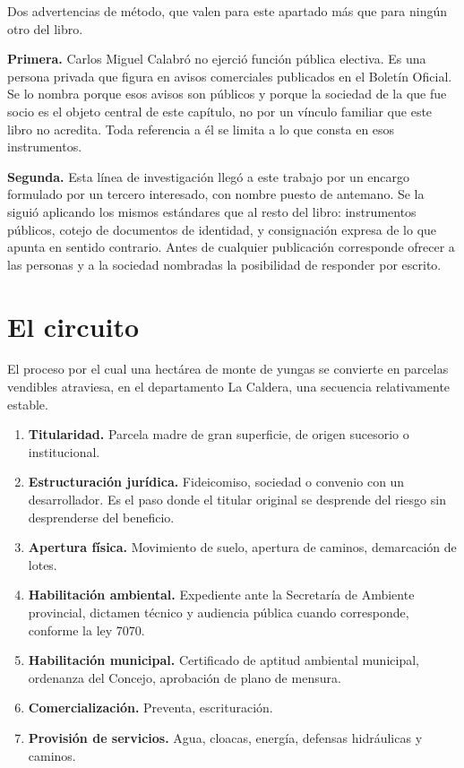 \begin{cautela}
Dos advertencias de método, que valen para este apartado más que para ningún otro del libro.

\textbf{Primera.} Carlos Miguel Calabró no ejerció función pública electiva. Es una persona privada que figura en avisos comerciales publicados en el Boletín Oficial. Se lo nombra porque esos avisos son públicos y porque la sociedad de la que fue socio es el objeto central de este capítulo, no por un vínculo familiar que este libro no acredita. Toda referencia a él se limita a lo que consta en esos instrumentos.

\textbf{Segunda.} Esta línea de investigación llegó a este trabajo por un encargo formulado por un tercero interesado, con nombre puesto de antemano. Se la siguió aplicando los mismos estándares que al resto del libro: instrumentos públicos, cotejo de documentos de identidad, y consignación expresa de lo que apunta en sentido contrario. Antes de cualquier publicación corresponde ofrecer a las personas y a la sociedad nombradas la posibilidad de responder por escrito.
\end{cautela}

\section{El circuito}

El proceso por el cual una hectárea de monte de yungas se convierte en parcelas vendibles atraviesa, en el departamento La Caldera, una secuencia relativamente estable.

\begin{enumerate}
\item \textbf{Titularidad.} Parcela madre de gran superficie, de origen sucesorio o institucional.
\item \textbf{Estructuración jurídica.} Fideicomiso, sociedad o convenio con un desarrollador. Es el paso donde el titular original se desprende del riesgo sin desprenderse del beneficio.
\item \textbf{Apertura física.} Movimiento de suelo, apertura de caminos, demarcación de lotes.
\item \textbf{Habilitación ambiental.} Expediente ante la Secretaría de Ambiente provincial, dictamen técnico y audiencia pública cuando corresponde, conforme la ley 7070.
\item \textbf{Habilitación municipal.} Certificado de aptitud ambiental municipal, ordenanza del Concejo, aprobación de plano de mensura.
\item \textbf{Comercialización.} Preventa, escrituración.
\item \textbf{Provisión de servicios.} Agua, cloacas, energía, defensas hidráulicas y caminos.
\end{enumerate}

